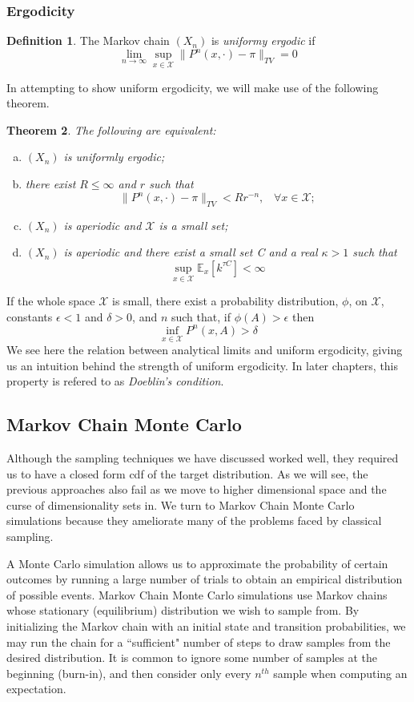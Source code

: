 \documentclass[11pt, a4paper]{article}
\theoremstyle{plain}
\newtheorem{thm}{Theorem}[section] %
\theoremstyle{definition}
\newtheorem{defn}[thm]{Definition} %
\begin{document}
\subsubsection{Ergodicity}
\begin{defn} The Markov chain $(X_n)$ is \emph{uniformy ergodic} if 
$$\lim_{n\to\infty}\sup_{x\in\mathcal{X}} \|P^n(x, \cdot) - \pi \|_{TV} = 0$$
\end{defn}
In attempting to show uniform ergodicity, we will make use of the following theorem.
\begin{thm}
The following are equivalent:
\begin{enumerate}[(a)]
\item $(X_n)$ is uniformly ergodic;
\item there exist $R \le \infty$ and $r$ such that
$$\|P^n(x, \cdot) - \pi \|_{TV} < Rr^{-n}, \hspace{10pt} \forall x\in\mathcal{X};$$
\item $(X_n)$ is aperiodic and $\mathcal{X}$ is a small set;
\item $(X_n)$ is aperiodic and there exist a small set C and a real $\kappa > 1$
such that
$$\sup_{x\in\mathcal{X}} \mathbb{E}_x[k^{\tau C}] <\infty$$
\end{enumerate}
\end{thm}
If the whole space $\mathcal{X}$ is small, there exist a probability distribution,
$\phi$, on $\mathcal{X}$, constants $\epsilon < 1$ and $\delta > 0$,
and $n$ such that, if $\phi(A) > \epsilon$ then
$$\inf_{x\in\mathcal{X}} P^n(x, A) > \delta$$
We see here the relation between analytical limits and uniform ergodicity,
giving us an intuition behind the strength of uniform ergodicity. In later chapters,
this property is refered to as \emph{Doeblin's condition}.

\subsection{Markov Chain Monte Carlo}
Although the sampling techniques we have discussed worked well, they required us to 
have a closed form cdf of the target distribution. As we will see, the previous approaches also fail as we move to higher dimensional space and the curse of dimensionality sets in. We turn to Markov Chain Monte Carlo simulations because they ameliorate many of the problems faced by classical sampling.


A Monte Carlo simulation allows us to approximate the probability of certain outcomes by running a large number of
trials to obtain an empirical distribution of possible events. 
Markov Chain Monte Carlo simulations use Markov chains whose stationary (equilibrium) distribution we wish to sample from. By initializing the Markov chain with an initial state and transition probabilities, we may run the chain for a ``sufficient" number of steps to draw samples from the desired distribution. It is common to ignore some number of samples at the beginning (burn-in), and then consider only every $n^{{th}}$ sample when computing an expectation.
\end{document}
